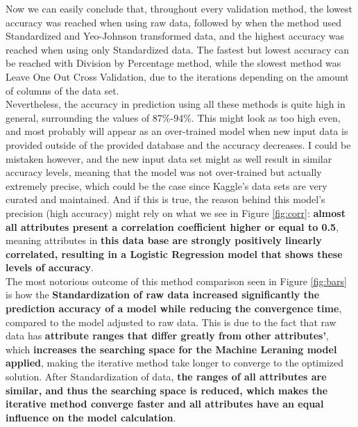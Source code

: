 \documentclass[11pt]{article}
\begin{document}
Now we can easily conclude that, throughout every validation method, the lowest accuracy was reached when using raw data, followed by when the method used Standardized and Yeo-Johnson transformed data, and the highest accuracy was reached when using only Standardized data. The fastest but lowest accuracy can be reached with Division by Percentage method, while the slowest method was Leave One Out Cross Validation, due to the iterations depending on the amount of columns of the data set.
\\

Nevertheless, the accuracy in prediction using all these methods is quite high in general, surrounding the values of 87\%-94\%. This might look as too high even, and most probably will appear as an over-trained model when new input data is provided outside of the provided database and the accuracy decreases. I could be mistaken however, and the new input data set might as well result in similar accuracy levels, meaning that the model was not over-trained but actually extremely precise, which could be the case since Kaggle's data sets are very curated and maintained. And if this is true, the reason behind this model's precision (high accuracy) might rely on what we see in Figure \ref{fig:corr}: \textbf{almost all attributes present a correlation coefficient higher or equal to 0.5}, meaning attributes in \textbf{this data base are strongly positively linearly correlated, resulting in a Logistic Regression model that shows these levels of accuracy}.
\\

The most notorious outcome of this method comparison seen in Figure \ref{fig:bars} is how the \textbf{Standardization of raw data increased significantly the prediction accuracy of a model while reducing the convergence time}, compared to the model adjusted to raw data. This is due to the fact that raw data has \textbf{attribute ranges that differ greatly from other attributes'}, which \textbf{increases the searching space for the Machine Leraning model applied}, making the iterative method take longer to converge to the optimized solution. After Standardization of data, \textbf{the ranges of all attributes are similar, and thus the searching space is reduced, which makes the iterative method converge faster and all attributes have an equal influence on the model calculation}.
\\
\end{document}
